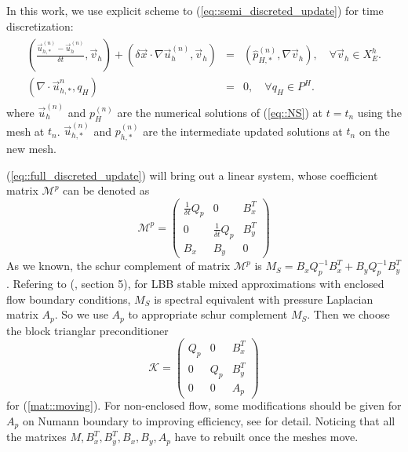 \documentclass{eajam}
\begin{document}
      In this work, we use explicit scheme to
      (\ref{eq::semi_discreted_update}) for time discretization:
      \begin{eqnarray}
        \begin{aligned}
          \left ( \frac{\vec{u}_{h, *}^{(n)} - \vec{u}_h^{(n)}}{\delta
            t},
            \vec{v}_h \right) + \left( \delta \vec{x} \cdot \nabla 
            \vec{u}_{h}^{(n)}, \vec{v}_h \right)  & = & \left( 
            \hat{p}_{H, *}^{(n)}, \nabla \vec{v}_h \right), \quad
          \forall \vec{v}_h \in X_E^h. \\
          \left( \nabla \cdot \vec{u}_{h, *}^{n}, q_H \right) & = & 0, \quad
          \forall q_H \in P^H.
        \end{aligned}
        \label{eq::full_discreted_update}
      \end{eqnarray}
      where $\vec{u}_h^{(n)}$ and $p_H^{(n)}$ are the numerical
      solutions of (\ref{eq::NS}) at $t = t_{n}$ using the mesh at
      $t_n$. $\vec{u}_{h,*}^{(n)}$ and $p_{h, *}^{(n)}$ are the
      intermediate updated solutions at $t_{n}$ on the new
      mesh. 
  
      (\ref{eq::full_discreted_update}) will bring out a linear
      system, whose coefficient matrix $\mathcal{M}^p$ can be denoted as
      \begin{equation}
        \mathcal{M}^p = 
        \left(
          \begin{array}{lll}
            \frac{1}{\delta t} Q_p & 0 & B_x^T \\
            0 & \frac{1}{\delta t} Q_p & B_y^T \\
            B_x & B_y & 0
          \end{array}
        \right)
        \label{mat::moving}
      \end{equation}
      As we known, the schur complement of matrix $\mathcal{M}^p$ is 
      $M_S = B_x Q_p^{-1} B_x^T + B_y Q_p^{-1} B_y^T$. Refering to
      (\cite{elman2005finite}, section 5), for LBB stable mixed
      approximations with enclosed flow boundary conditions, $M_S$ is
      spectral equivalent with pressure Laplacian matrix $A_p$. So we
      use $A_p$ to appropriate schur complement $M_S$. Then we choose
      the block trianglar preconditioner
      \begin{equation}
        \mathcal{K} =
        \left(
          \begin{array}{lll}
            Q_p & 0 & B_x^T \\
            0 & Q_p & B_y^T \\
            0 & 0 & A_p 
          \end{array}
        \right)
      \end{equation}
      for (\ref{mat::moving}). For non-enclosed flow, some
      modifications should be given for $A_p$ on Numann boundary to
      improving efficiency, see \cite{elman2009boundary} for
      detail. Noticing that all the matrixes $M, B_x^T, B_y^T, B_x,
      B_y, A_p$ have to rebuilt once the meshes move. 
\end{document}
